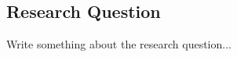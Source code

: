 \subsection{Research Question}
\label{sec:motivation}

Write something about the research question...